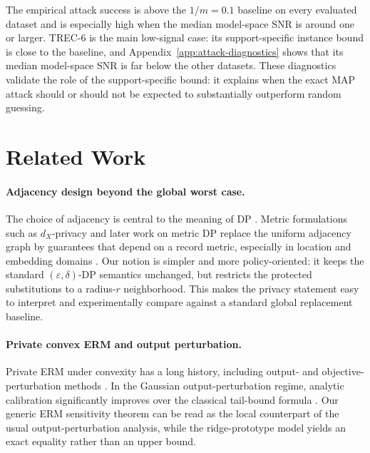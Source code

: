 \documentclass[conference,compsoc]{IEEEtran}
\begin{document}
The empirical attack success is above the $1/m=0.1$ baseline on every evaluated dataset and is especially high when the median model-space SNR is around one or larger. TREC-6 is the main low-signal case: its support-specific instance bound is close to the baseline, and Appendix~\ref{app:attack-diagnostics} shows that its median model-space SNR is far below the other datasets. These diagnostics validate the role of the support-specific bound: it explains when the exact MAP attack should or should not be expected to substantially outperform random guessing.

\section{Related Work}
\label{sec:related}

\paragraph{Adjacency design beyond the global worst case.}
The choice of adjacency is central to the meaning of DP \cite{dwork2014book}. Metric formulations such as $d_X$-privacy and later work on metric DP replace the uniform adjacency graph by guarantees that depend on a record metric, especially in location and embedding domains \cite{chatzikokolakis2013metrics,imola2022metricdp}. Our notion is simpler and more policy-oriented: it keeps the standard $(\varepsilon,\delta)$-DP semantics unchanged, but restricts the protected substitutions to a radius-$r$ neighborhood. This makes the privacy statement easy to interpret and experimentally compare against a standard global replacement baseline.

\paragraph{Private convex ERM and output perturbation.}
Private ERM under convexity has a long history, including output- and objective-perturbation methods \cite{chaudhuri2011erm}. In the Gaussian output-perturbation regime, analytic calibration significantly improves over the classical tail-bound formula \cite{balle2018analytic}. Our generic ERM sensitivity theorem can be read as the local counterpart of the usual output-perturbation analysis, while the ridge-prototype model yields an exact equality rather than an upper bound.
\end{document}
